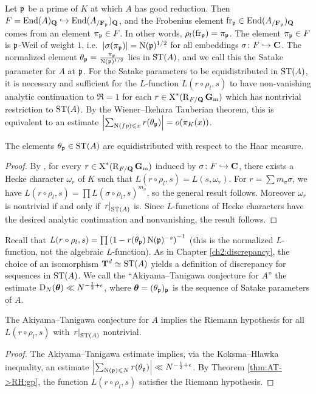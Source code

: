 Let $\mathfrak{p}$ be a prime of $K$ at which $A$ has good reduction. Then 
$F = \operatorname{End}(A)_{\mathbf{Q}}\hookrightarrow \operatorname{End}(A_{/\mathbf{F}_{\mathfrak{p}}})_{\mathbf{Q}}$, and the Frobenius 
element $\mathrm{fr}_{\mathfrak{p}}\in \operatorname{End}(A_{/\mathbf{F}_{\mathfrak{p}}})_{\mathbf{Q}}$ comes from an element 
$\pi_{\mathfrak{p}}\in F$. In other words, $\rho_l(\mathrm{fr}_{\mathfrak{p}}) = \pi_{\mathfrak{p}}$. The element 
$\pi_{\mathfrak{p}}\in F$ is $\mathfrak{p}$-Weil of weight $1$, 
i.e.~$|\sigma(\pi_{\mathfrak{p}})| = \operatorname{N}(\mathfrak{p})^{1/2}$ for all embeddings 
$\sigma\colon F\hookrightarrow \mathbf{C}$. The normalized element 
$\theta_{\mathfrak{p}} = \frac{\pi_{\mathfrak{p}}}{\operatorname{N}(\mathfrak{p})^{1/2}}$ lies in $\mathrm{ST}(A)$, and we call this 
the Satake parameter for $A$ at $\mathfrak{p}$. For the Satake parameters to be 
equidistributed in $\mathrm{ST}(A)$, it is necessary and sufficient for the 
$L$-function $L(r\circ \rho_l,s)$ to have non-vanishing analytic continuation 
to $\Re =1$ for each $r\in \operatorname{X}^\ast(\operatorname{R}_{F/\mathbf{Q}}\mathbf{G}_\mathrm{m})$ which has nontrivial 
restriction to $\mathrm{ST}(A)$. By the Wiener--Ikehara Tauberian theorem, this is 
equivalent to an estimate 
$\left| \sum_{\operatorname{N}(fp)\leqslant x} r(\theta_{\mathfrak{p}})\right| = o(\pi_K(x))$. 

\begin{theorem}
The elements $\theta_{\mathfrak{p}}\in \mathrm{ST}(A)$ are equidistributed with respect to the 
Haar measure. 
\end{theorem}
\begin{proof}
By \cite[Th.~10, 11]{serre-tate-1968}, for every 
$r\in \operatorname{X}^\ast(\operatorname{R}_{F/\mathbf{Q}}\mathbf{G}_\mathrm{m})$ induced by $\sigma\colon F\hookrightarrow \mathbf{C}$, 
there exists a Hecke character $\omega_r$ of $K$ such that 
$L(r\circ \rho_l,s) = L(s,\omega_r)$. For $r = \sum m_\sigma \sigma$, we have 
$L(r\circ \rho_l,s) = \prod L(\sigma\circ \rho_l,s)^{m_\sigma}$, so the general 
result follows. Moreover $\omega_r$ is nontrivial if and only if 
$\left.r\right|_{\mathrm{ST}(A)}$ is. Since $L$-functions of Hecke characters have the 
desired analytic continuation and nonvanishing, the result follows. 
\end{proof}

Recall that 
$L(r\circ \rho_l,s) = \prod \left(1 - r(\theta_{\mathfrak{p}}) \operatorname{N}(\mathfrak{p})^{-s}\right)^{-1}$ 
(this is the normalized $L$-function, not the algebraic $L$-function). 
As in Chapter \ref{ch2:discrepancy}, the choice of an isomorphism
$\mathbf{T}^d\simeq \mathrm{ST}(A)$ yields a definition of discrepancy 
for sequences in $\mathrm{ST}(A)$. We call the ``Akiyama--Tanigawa conjecture for $A$'' 
the estimate $\operatorname{D}_N({\boldsymbol\theta}) \ll N^{-\frac 1 2+\epsilon}$, where 
${\boldsymbol\theta} = (\theta_{\mathfrak{p}})_{\mathfrak{p}}$ is the sequence of Satake parameters of $A$. 

\begin{theorem}\label{AT->RH:AB}
The Akiyama--Tanigawa conjecture for $A$ 
implies the Riemann hypothesis for all $L(r\circ \rho_l,s)$ with 
$\left. r\right|_{\mathrm{ST}(A)}$ nontrivial. 
\end{theorem}
\begin{proof}
The Akiyama--Tanigawa estimate implies, via the Koksma--Hlawka inequality, an 
estimate 
$\left| \sum_{\operatorname{N}(\mathfrak{p})\leqslant N} r(\theta_{\mathfrak{p}})\right| \ll N^{-\frac 1 2+\epsilon}$. 
By Theorem \ref{thm:AT->RH:gp}, the function $L(r\circ \rho_l,s)$ satisfies 
the Riemann hypothesis. 
\end{proof}

